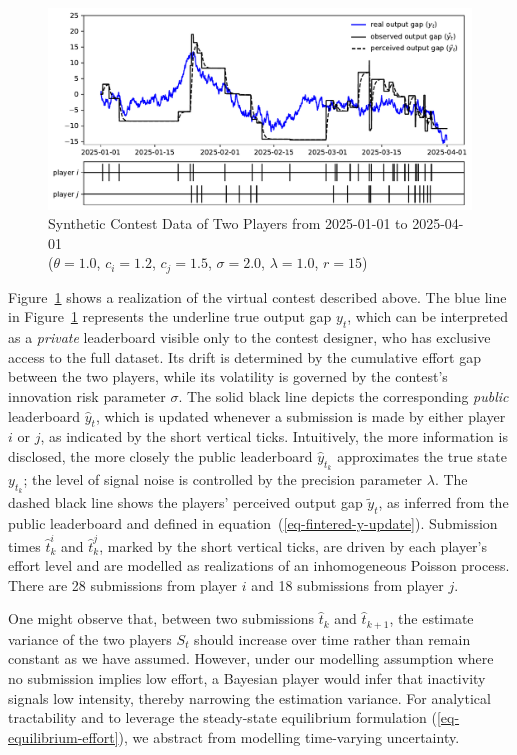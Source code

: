 \documentclass[mnsc]{informs3}
\begin{document}
\begin{figure}[!ht]
	\noindent\includegraphics[scale=0.75]{synthetic_data.pdf}
	\caption{Synthetic Contest Data of Two Players from 2025-01-01 to 2025-04-01\\($\theta = 1.0$, $c_i = 1.2$, $c_j = 1.5$, $\sigma = 2.0$, $\lambda = 1.0$, $r = 15$)}
	\label{fig-synthetic_90}
\end{figure}

Figure~\ref{fig-synthetic_90} shows a realization of the virtual contest described above.
The blue line in Figure~\ref{fig-synthetic_90} represents the underline true output gap $y_t$, which can be interpreted as a \textit{private} leaderboard visible only to the contest designer, who has exclusive access to the full dataset.
Its drift is determined by the cumulative effort gap between the two players, while its volatility is governed by the contest’s innovation risk parameter $\sigma$. 
The solid black line depicts the corresponding \textit{public} leaderboard $\hat{y}_t$, which is updated whenever a submission is made by either player $i$ or $j$, as indicated by the short vertical ticks.
Intuitively, the more information is disclosed, the more closely the public leaderboard $\hat{y}_{t_k}$ approximates the true state $y_{t_k}$; the level of signal noise is controlled by the precision parameter $\lambda$.
The dashed black line shows the players’ perceived output gap $\tilde{y}_t$, as inferred from the public leaderboard and defined in equation~(\ref{eq-fintered-y-update}).
Submission times $\hat{t}^i_k$ and $\hat{t}^j_k$, marked by the short vertical ticks, are driven by each player’s effort level and are modelled as realizations of an inhomogeneous Poisson process.
There are 28 submissions from player $i$ and 18 submissions from player $j$. 

One might observe that, between two submissions $\hat{t}_{k}$ and $\hat{t}_{k+1}$, the estimate variance of the two players $S_t$ should increase over time rather than remain constant as we have assumed. 
However, under our modelling assumption where no submission implies low effort, a Bayesian player would infer that inactivity signals low intensity, thereby narrowing the estimation variance. 
For analytical tractability and to leverage the steady-state equilibrium formulation (\ref{eq-equilibrium-effort}), we abstract from modelling time-varying uncertainty.
\end{document}
